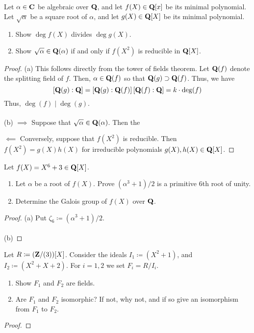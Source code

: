 \begin{problem}
Let $\alpha\in\mathbf{C}$ be algebraic over $\mathbf{Q}$, and let $f(X)\in\mathbf{Q}[x]$ be
its minimal polynomial. Let $\sqrt{\alpha}$ be a square root of $\alpha$,
and let $g(X)\in\mathbf{Q}[X]$ be its minimal polynomial.
\begin{enumerate}[label=(\alph*)]
\item Show $\deg f(X)$ divides $\deg g(X)$.
\item Show $\sqrt{\alpha}\in\mathbf{Q}(\alpha)$ if and only if $f(X^2)$ is
  reducible in $\mathbf{Q}[X]$.
\end{enumerate}
\end{problem}
\begin{proof}
(a) This follows directly from the tower of fields theorem. Let $\mathbf{Q}(f)$
denote the splitting field of $f$. Then, $\alpha\in\mathbf{Q}(f)$ so that
$\mathbf{Q}(g)\supset\mathbf{Q}(f)$. Thus, we have
\[
\left[\mathbf{Q}(g):\mathbf{Q}\right]=\left[\mathbf{Q}(g):\mathbf{Q}(f)\right]\left[\mathbf{Q}(f):\mathbf{Q}\right]=k\cdot\deg(f)
\]
Thus, $\deg(f)\mid\deg(g)$.
\\\\
(b) $\implies$ Suppose that $\sqrt{\alpha}\in\mathbf{Q}(\alpha)$. Then the

$\impliedby$ Conversely, suppose that $f(X^2)$ is reducible. Then
$f(X^2)=g(X)h(X)$ for irreducible polynomials $g(X),h(X)\in\mathbf{Q}[X]$.
\end{proof}

\begin{problem}
Let $f(X)=X^6+3\in\mathbf{Q}[X]$.
\begin{enumerate}[label=(\alph*)]
\item Let $\alpha$ be a root of $f(X)$. Prove $(\alpha^3+1)/2$ is a
  primitive 6th root of unity.
\item Determine the Galois group of $f(X)$ over $\mathbf{Q}$.
\end{enumerate}
\end{problem}
\begin{proof}
(a) Put $\zeta_6\coloneqq(\alpha^3+1)/2$.
\\\\
(b)
\end{proof}

\begin{problem}
Let $R\coloneqq(\mathbf{Z}/(3))[X]$. Consider the ideals $I_1\coloneqq(X^2+1)$,
and $I_2\coloneqq(X^2+X+2)$. For $i=1,2$ we set $F_i=R/I_i$.
\begin{enumerate}[label=(\alph*)]
\item Show $F_1$ and $F_2$ are fields.
\item Are $F_1$ and $F_2$ isomorphic? If not, why not, and if so give an
  isomorphism from $F_1$ to $F_2$.
\end{enumerate}
\end{problem}
\begin{proof}
\end{proof}


